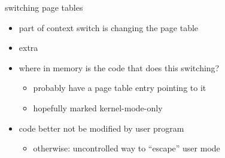 \begin{frame}{switching page tables}
    \begin{itemize}
    \item part of context switch is changing the page table
    \item extra 
    \vspace{.5cm}
    \item<2-> where in memory is the code that does this switching?
        \begin{itemize}
            \item<3-> probably have a page table entry pointing to it
            \item<3-> hopefully marked kernel-mode-only
        \end{itemize}
    \item<4-> code better not be modified by user program
        \begin{itemize}
        \item otherwise: uncontrolled way to ``escape'' user mode
        \end{itemize}
    \end{itemize}
\end{frame}
